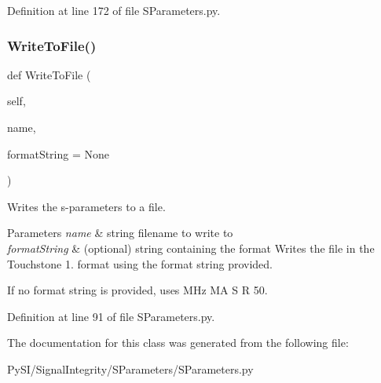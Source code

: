 Definition at line 172 of file S\+Parameters.\+py.

\mbox{\label{classSignalIntegrity_1_1SParameters_1_1SParameters_1_1SParameters_add396ed0a719fa2c93037bc8486d2ff1}} 
\subsubsection{\texorpdfstring{Write\+To\+File()}{WriteToFile()}}
{\footnotesize\ttfamily def Write\+To\+File (\begin{DoxyParamCaption}\item[{}]{self,  }\item[{}]{name,  }\item[{}]{format\+String = {\ttfamily None} }\end{DoxyParamCaption})}



Writes the s-\/parameters to a file. 


\begin{DoxyParams}{Parameters}
{\em name} & string filename to write to \\
\hline
{\em format\+String} & (optional) string containing the format Writes the file in the Touchstone 1. format using the format string provided.\\
\hline
\end{DoxyParams}
If no format string is provided, uses \textquotesingle{} M\+Hz MA S R 50.\textquotesingle{} 

Definition at line 91 of file S\+Parameters.\+py.



The documentation for this class was generated from the following file\+:\begin{DoxyCompactItemize}
\item 
Py\+S\+I/\+Signal\+Integrity/\+S\+Parameters/S\+Parameters.\+py\end{DoxyCompactItemize}
